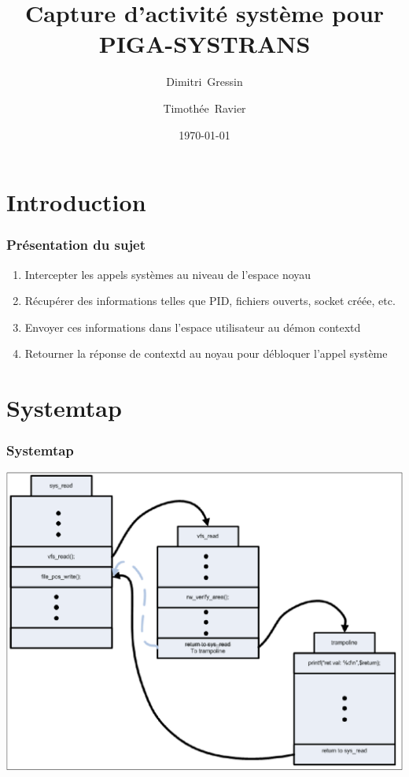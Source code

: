 \documentclass{beamer}
\title{Capture d'activité système pour PIGA-SYSTRANS}
\author{Dimitri~Gressin \and Timothée~Ravier}
\institute{ENSI de Bourges}
\date{\today}
\begin{document}
{
	\framenumberoff
	\watermarkoff
	\begin{frame}
	\titlepage
	\end{frame}
}


\section{Introduction}
\begin{frame}
\frametitle{Présentation du sujet}
\begin{enumerate}
	\item Intercepter les appels systèmes au niveau de l'espace noyau
	\item Récupérer des informations telles que PID, fichiers ouverts, socket créée, etc.
	\item Envoyer ces informations dans l'espace utilisateur au démon contextd
	\item Retourner la réponse de contextd au noyau pour débloquer l'appel système
\end{enumerate}
\end{frame}

\section{Systemtap}
\begin{frame}
\frametitle{Systemtap}
\begin{center}
	\includegraphics[scale=0.25]{kretprob.png}
\end{center}
\end{frame}
\end{document}
